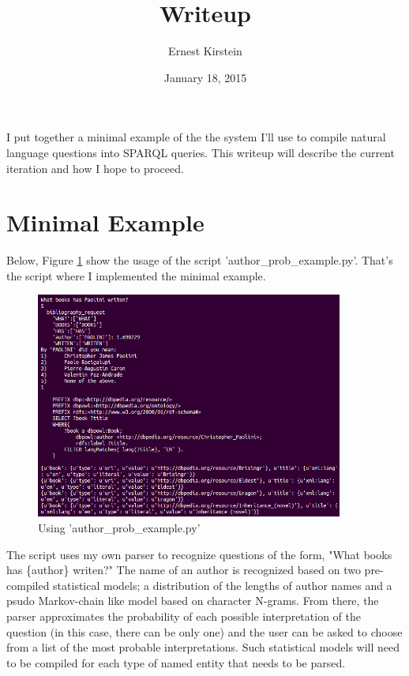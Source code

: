 \documentclass[11pt]{article}
\begin{document}
\title{Writeup}
\author{Ernest Kirstein}
\date{January 18, 2015}
\maketitle

I put together a minimal example of the the system I'll use to compile
natural language questions into SPARQL queries. This writeup will describe
the current iteration and how I hope to proceed.

\section*{Minimal Example}

Below, Figure \ref{fig:minimal} show the usage of the script 'author\_prob\_example.py'.
That's the script where I implemented the minimal example. 

\begin{figure}[h!]
    \centering
    \includegraphics[width=0.9\textwidth,natwidth=1,natheight=1]{minimal_example.png}
    \caption{Using 'author\_prob\_example.py'}
    \label{fig:minimal}
\end{figure}

The script uses my own parser to recognize questions of the form,
"What books has \{author\} writen?" The name of an author is recognized based on
two pre-compiled statistical models; a distribution of the lengths of author names
and a psudo Markov-chain like model based on character N-grams. From there,
the parser approximates the probability of each possible interpretation of the
question (in this case, there can be only one) and the user can be asked to choose
from a list of the most probable interpretations. Such statistical models will
need to be compiled for each type of named entity that needs to be parsed.
\end{document}
